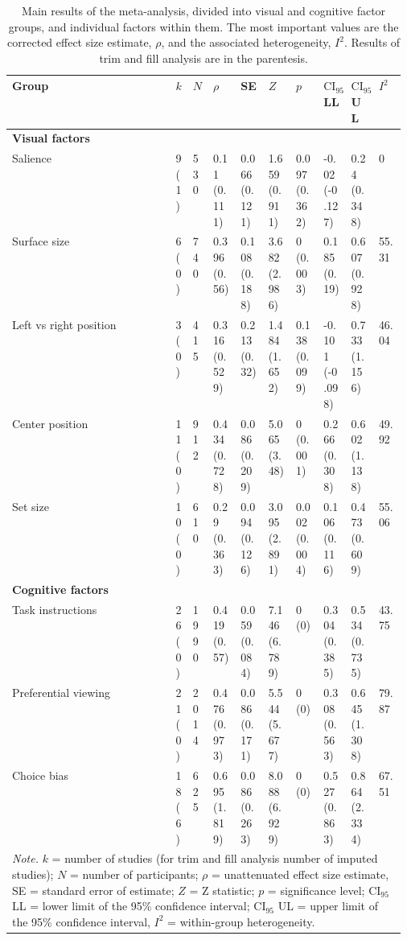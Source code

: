 \begin{table}[ht]
\centering
\caption{Main results of the meta-analysis, divided into visual and cognitive factor groups, and individual factors within them. The most important values are the corrected effect size estimate, $\rho$, and the associated heterogeneity, $I^2$. Results of trim and fill analysis are in the parentesis.} 
\label{tab:main_results}
\begingroup\small
\begin{tabular}{lp{0.03\linewidth}p{0.05\linewidth}p{0.07\linewidth}p{0.07\linewidth}p{0.07\linewidth}p{0.07\linewidth}p{0.07\linewidth}p{0.07\linewidth}p{0.07\linewidth}}
  \hline
Group & $k$ & $N$ & $\rho$ & SE & $Z$ & $p$ & $\textrm{CI}_{95}$ LL & $\textrm{CI}_{95}$ UL & $I^2$ \\ 
  \hline
\textbf{Visual factors} &  &  &  &  &  &  &  &  &  \\ 
  Salience & 9 (1) & 530 & 0.11 (0.111) & 0.066 (0.121) & 1.659 (0.911) & 0.097 (0.362) & -0.02 (-0.127) & 0.24 (0.348) & 0 \\ 
  Surface size & 6 (0) & 740 & 0.396 (0.56) & 0.108 (0.188) & 3.682 (2.986) & 0 (0.003) & 0.185 (0.19) & 0.607 (0.928) & 55.31 \\ 
  Left vs right position & 3 (0) & 415 & 0.316 (0.529) & 0.213 (0.32) & 1.484 (1.652) & 0.138 (0.099) & -0.101 (-0.098) & 0.733 (1.156) & 46.04 \\ 
  Center position & 11 (0) & 912 & 0.434 (0.728) & 0.086 (0.209) & 5.065 (3.48) & 0 (0.001) & 0.266 (0.308) & 0.602 (1.138) & 49.92 \\ 
  Set size & 10 (0) & 610 & 0.29 (0.363) & 0.094 (0.126) & 3.095 (2.891) & 0.002 (0.004) & 0.106 (0.116) & 0.473 (0.609) & 55.06 \\ 
  \textbf{Cognitive factors} &  &  &  &  &  &  &  &  &  \\ 
  Task instructions & 26 (0) & 1990 & 0.419 (0.57) & 0.059 (0.084) & 7.146 (6.789) & 0 (0) & 0.304 (0.385) & 0.534 (0.735) & 43.75 \\ 
  Preferential viewing & 21 (0) & 2014 & 0.476 (0.973) & 0.086 (0.171) & 5.544 (5.677) & 0 (0) & 0.308 (0.563) & 0.645 (1.308) & 79.87 \\ 
  Choice bias & 18 (6) & 625 & 0.695 (1.819) & 0.086 (0.263) & 8.088 (6.929) & 0 (0) & 0.527 (0.863) & 0.864 (2.334) & 67.51 \\ 
   \hline 
 \multicolumn{10}{p{0.9\textwidth}}{\scriptsize{\textit{Note.} $k$ = number of studies (for trim and fill analysis number of imputed studies); $N$ = number of participants; $\rho$ = unattenuated effect size estimate, SE = standard error of estimate; $Z$ = Z statistic; $p$ = significance level; $\textrm{CI}_{95}$ LL = lower limit of the 95\% confidence interval; $\textrm{CI}_{95}$ UL = upper limit of the 95\% confidence interval, $I^2$ = within-group heterogeneity.}} 
\end{tabular}
\endgroup
\end{table}
